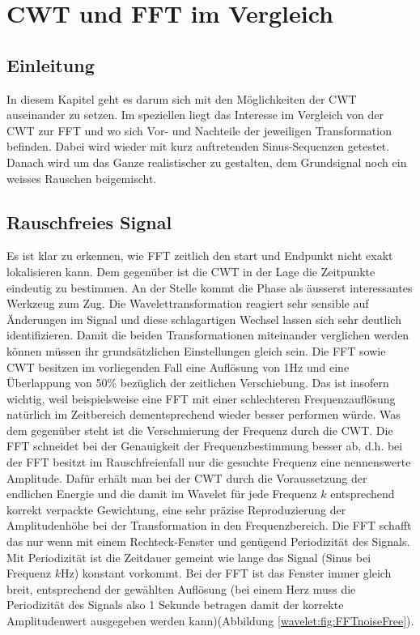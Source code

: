%
%
%
%
\section{CWT und FFT im Vergleich
	\label{wavelets:section:teil4}}

\subsection{Einleitung
	\label{wavelets:subsection:CWTvsFFTEinleitung}}
In diesem Kapitel geht es darum sich mit den Möglichkeiten der CWT auseinander zu setzen. Im speziellen liegt das Interesse im Vergleich von der CWT zur FFT und wo sich Vor- und Nachteile der jeweiligen Transformation befinden. Dabei wird wieder mit kurz auftretenden Sinus-Sequenzen getestet.
Danach wird um das Ganze realistischer zu gestalten, dem Grundsignal noch ein weisses Rauschen beigemischt.

\subsection{Rauschfreies Signal
	\label{wavelets:subsection:CWTvsFFTRauschfrei}}
Es ist klar zu erkennen, wie FFT zeitlich den start und Endpunkt nicht exakt lokalisieren kann. Dem gegenüber ist die CWT in der Lage die Zeitpunkte eindeutig zu bestimmen. An der Stelle kommt die Phase als äusserst interessantes Werkzeug zum Zug. Die Wavelettransformation reagiert sehr sensible auf Änderungen im Signal und diese schlagartigen Wechsel lassen sich sehr deutlich identifizieren.
Damit die beiden Transformationen miteinander verglichen werden können müssen ihr grundsätzlichen Einstellungen gleich sein. Die FFT sowie CWT besitzen im vorliegenden Fall eine Auflösung von 1Hz und eine Überlappung von 50\% bezüglich der zeitlichen Verschiebung. Das ist insofern wichtig, weil beispielsweise eine FFT mit einer schlechteren Frequenzauflösung natürlich im Zeitbereich dementsprechend wieder besser performen würde.
Was dem gegenüber steht ist die Verschmierung der Frequenz durch die CWT. Die FFT schneidet bei der Genauigkeit der Frequenzbestimmung besser ab, d.h. bei der FFT besitzt im Rauschfreienfall nur die gesuchte Frequenz eine nennenswerte Amplitude. Dafür erhält man bei der CWT durch die Voraussetzung der endlichen Energie und die damit im Wavelet für jede Frequenz $k$ entsprechend korrekt verpackte Gewichtung, eine sehr präzise Reproduzierung der Amplitudenhöhe bei der Transformation in den Frequenzbereich. Die FFT schafft das nur wenn mit einem Rechteck-Fenster und genügend Periodizität des Signals. Mit Periodizität ist die Zeitdauer gemeint wie lange das Signal (Sinus bei Frequenz $k$Hz) konstant vorkommt. Bei der FFT ist das Fenster immer gleich breit, entsprechend der gewählten Auflösung (bei einem Herz muss die Periodizität des Signals also 1 Sekunde betragen damit der korrekte Amplitudenwert ausgegeben werden kann)(Abbildung \ref{wavelet:fig:FFTnoiseFree}).

